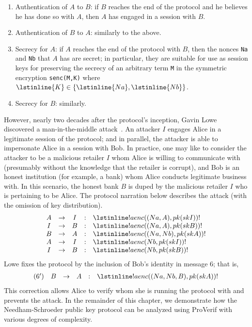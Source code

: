 \documentclass{book}
\newcommand{\A}{A}
\newcommand{\B}{B}
\newcommand{\M}{I}
\begin{document}
\begin{enumerate}
  \item Authentication of $\A$ to $\B$: if $\B$ reaches the end of the protocol and
  he believes he has done so with $\A$, then $\A$ has engaged in a session with $\B$.
  \item Authentication of $\B$ to $\A$: similarly to the above.
  \item Secrecy for $\A$: if $\A$ reaches the end of the protocol with $\B$, then the nonces \lstinline{Na} and \lstinline{Nb} that $\A$ has are secret; in particular, they are suitable for use as session keys for preserving the secrecy of an arbitrary term \lstinline{M} in the symmetric encryption \lstinline{senc(M,K)} where $ \lstinline{K}\in\{ \lstinline{Na}, \lstinline{Nb}\}$.
  \item Secrecy for $\B$: similarly.
\end{enumerate}
%
However, nearly two decades after the protocol's inception, Gavin Lowe discovered a man-in-the-middle attack~\cite{Lowe96}. An attacker $\M$ engages Alice in a legitimate session of the protocol; and in parallel, the attacker is able to impersonate Alice in a session with Bob. In practice, one may like to consider the attacker to be a malicious retailer $\M$ whom Alice is willing to communicate with (presumably without the knowledge that the retailer is corrupt), and Bob is an honest institution (for example, a bank) whom Alice conducts legitimate business with. In this scenario, the honest bank $\B$ is duped by the malicious retailer $\M$ who is pertaining to be Alice. The protocol narration below describes the attack (with the omission of key distribution).
\[
\begin{array}{ccccl}
\A &\rightarrow& \M &:& \lstinline!aenc((Na,A), pk(skI))! \\
\M &\rightarrow& \B &:& \lstinline!aenc((Na,A), pk(skB)) !\\
\B &\rightarrow& \A &:& \lstinline!aenc((Na,Nb), pk(skA))! \\
\A &\rightarrow& \M &:& \lstinline!aenc(Nb, pk(skI))! \\
\M &\rightarrow& \B &:& \lstinline!aenc(Nb, pk(skB))!
\end{array}
\]
%
Lowe fixes the protocol by the inclusion of Bob's identity in message 6; that is,
\[
\begin{array}{cccccl}
(6') & \B &\rightarrow& \A &:& \lstinline!aenc((Na,Nb,B), pk(skA))! \\
\end{array}
\]
This correction allows Alice to verify whom she is running the protocol with and prevents the attack. In the remainder of this chapter, we demonstrate how the Needham-Schroeder public key protocol can be analyzed using ProVerif with various degrees of complexity.
\end{document}
